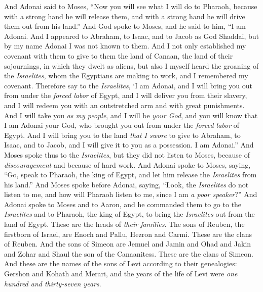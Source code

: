 \begin{biblechapter} %
 And Adonai said to Moses, “Now you will see what I will do to Pharaoh, because with a strong hand he will release them, and with a strong hand he will drive them out from his land.”
\verse And God spoke to Moses, and he said to him, “I am Adonai.
\verse And I appeared to Abraham, to Isaac, and to Jacob as God Shaddai, but by my name Adonai I was not known to them.
\verse And I not only established my covenant with them to give to them the land of Canaan, the land of their sojournings, in which they dwelt as aliens,
\verse but also I myself heard the groaning of the \textit{Israelites}, whom the Egyptians are making to work, and I remembered my covenant.
\verse Therefore say to the \textit{Israelites}, ‘I am Adonai, and I will bring you out from under the \textit{forced labor} of Egypt, and I will deliver you from their slavery, and I will redeem you with an outstretched arm and with great punishments.
\verse And I will take you \textit{as my people}, and I will be \textit{your God}, and you will know that I am Adonai your God, who brought you out from under the \textit{forced labor} of Egypt.
\verse And I will bring you to the land \textit{that I swore} to give to Abraham, to Isaac, and to Jacob, and I will give it to you as a possession. I am Adonai.”
\verse And Moses spoke thus to the \textit{Israelites}, but they did not listen to Moses, because of \textit{discouragement} and because of hard work.
\verse And Adonai spoke to Moses, saying,
\verse “Go, speak to Pharaoh, the king of Egypt, and let him release the \textit{Israelites} from his land.”
\verse And Moses spoke before Adonai, saying, “Look, the \textit{Israelites} do not listen to me, and how will Pharaoh listen to me, since I am \textit{a poor speaker}?”
\verse And Adonai spoke to Moses and to Aaron, and he commanded them to go to the \textit{Israelites} and to Pharaoh, the king of Egypt, to bring the \textit{Israelites} out from the land of Egypt.
 These are the heads of \textit{their families}. The sons of Reuben, the firstborn of Israel, are Enoch and Pallu, Hezron and Carmi. These are the clans of Reuben.
\verse And the sons of Simeon are Jemuel and Jamin and Ohad and Jakin and Zohar and Shaul the son of the Canaanitess. These are the clans of Simeon.
\verse And these are the names of the sons of Levi according to their genealogies: Gershon and Kohath and Merari, and the years of the life of Levi were \textit{one hundred and thirty-seven years}.

\end{biblechapter}
